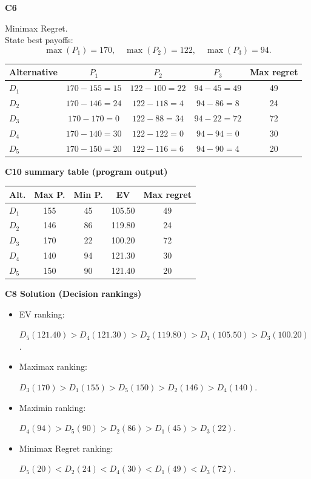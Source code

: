 \begin{ExamProblems}
		\textbf{C6}\par
		Minimax Regret.\\
				State best payoffs:
		\[
		\max(P_1)=170,\quad \max(P_2)=122,\quad \max(P_3)=94.
		\]
		\begin{center}
			\begin{tabular}{l c c c c}
				\toprule
				Alternative & $P_1$ & $P_2$ & $P_3$ & Max regret \\
				\midrule
				$D_1$ & $170-155=15$ & $122-100=22$ & $94-45=49$ & 49 \\
				$D_2$ & $170-146=24$ & $122-118=4$ & $94-86=8$ & 24 \\
				$D_3$ & $170-170=0$ & $122-88=34$ & $94-22=72$ & 72 \\
				$D_4$ & $170-140=30$ & $122-122=0$ & $94-94=0$ & 30 \\
				$D_5$ & $170-150=20$ & $122-116=6$ & $94-90=4$ & 20 \\
				\bottomrule
			\end{tabular}
		\end{center}
		

		\textbf{C10 summary table (program output)}\par
		\begin{center}
			\begin{tabular}{l c c c c}
				\hline
				Alt. & Max P. & Min P. & EV & Max regret \\
				\hline
				$D_1$ & 155 & 45 & 105.50 & 49 \\
				$D_2$ & 146 & 86 & 119.80 & 24 \\
				$D_3$ & 170 & 22 & 100.20 & 72 \\
				$D_4$ & 140 & 94 & 121.30 & 30 \\
				$D_5$ & 150 & 90 & 121.40 & 20 \\
				\hline
			\end{tabular}
		\end{center}
		
		\textbf{C8 Solution (Decision rankings)}\par
		\begin{itemize}
			\item EV ranking: \par $D_5(121.40)>D_4(121.30)>D_2(119.80)>D_1(105.50)>D_3(100.20)$.
			\item Maximax ranking:\par $D_3(170)>D_1(155)>D_5(150)>D_2(146)>D_4(140)$.
			\item Maximin ranking: \par $D_4(94)>D_5(90)>D_2(86)>D_1(45)>D_3(22)$.
			\item Minimax Regret ranking:\par $D_5(20)<D_2(24)<D_4(30)<D_1(49)<D_3(72)$.
		\end{itemize}
		

\end{ExamProblems}
